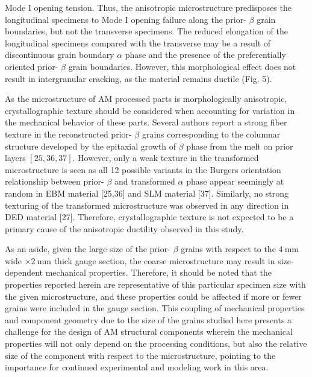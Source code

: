 \documentclass[10pt]{article}
\begin{document}
Mode I opening tension. Thus, the anisotropic microstructure predisposes the longitudinal specimens to Mode I opening failure along the prior- $\beta$ grain boundaries, but not the transverse specimens. The reduced elongation of the longitudinal specimens compared with the transverse may be a result of discontinuous grain boundary $\alpha$ phase and the presence of the preferentially oriented prior- $\beta$ grain boundaries. However, this morphological effect does not result in intergranular cracking, as the material remains ductile (Fig. 5).

As the microstructure of AM processed parts is morphologically anisotropic, crystallographic texture should be considered when accounting for variation in the mechanical behavior of these parts. Several authors report a strong fiber texture in the reconstructed prior- $\beta$ grains corresponding to the columnar structure developed by the epitaxial growth of $\beta$ phase from the melt on prior layers $[25,36,37]$. However, only a weak texture in the transformed microstructure is seen as all 12 possible variants in the Burgers orientation relationship between prior- $\beta$ and transformed $\alpha$ phase appear seemingly at random in EBM material [25,36] and SLM material [37]. Similarly, no strong texturing of the transformed microstructure was observed in any direction in DED material [27]. Therefore, crystallographic texture is not expected to be a primary cause of the anisotropic ductility observed in this study.

As an aside, given the large size of the prior- $\beta$ grains with respect to the $4 \mathrm{~mm}$ wide $\times 2 \mathrm{~mm}$ thick gauge section, the coarse microstructure may result in size-dependent mechanical properties. Therefore, it should be noted that the properties reported herein are representative of this particular specimen size with the given microstructure, and these properties could be affected if more or fewer grains were included in the gauge section. This coupling of mechanical properties and component geometry due to the size of the grains studied here presents a challenge for the design of AM structural components wherein the mechanical properties will not only depend on the processing conditions, but also the relative size of the component with respect to the microstructure, pointing to the importance for continued experimental and modeling work in this area.
\end{document}
